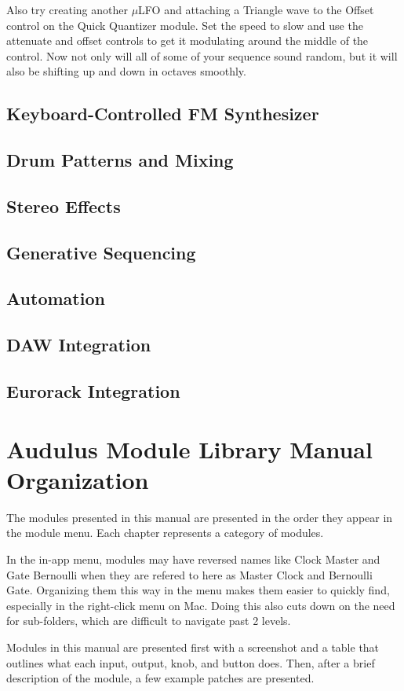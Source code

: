 \documentclass[11pt]{book}
\begin{document}
\begin{multicols*}{2}
Also try creating another $\mu$LFO and attaching a Triangle wave to the Offset control on the Quick Quantizer module. Set the speed to slow and use the attenuate and offset controls to get it modulating around the middle of the control. Now not only will all of some of your sequence sound random, but it will also be shifting up and down in octaves smoothly.

\subsection{Keyboard-Controlled FM Synthesizer}

\subsection{Drum Patterns and Mixing}

\subsection{Stereo Effects}

\subsection{Generative Sequencing}

\subsection{Automation}

\subsection{DAW Integration}

\subsection{Eurorack Integration}

\section{Audulus Module Library Manual Organization}

The modules presented in this manual are presented in the order they appear in the module menu. Each chapter represents a category of modules.

In the in-app menu, modules may have reversed names like Clock Master and Gate Bernoulli when they are refered to here as Master Clock and Bernoulli Gate. Organizing them this way in the menu makes them easier to quickly find, especially in the right-click menu on Mac. Doing this also cuts down on the need for sub-folders, which are difficult to navigate past 2 levels.

Modules in this manual are presented first with a screenshot and a table that outlines what each input, output, knob, and button does. Then, after a brief description of the module, a few example patches are presented.

\end{multicols*}
\end{document}
